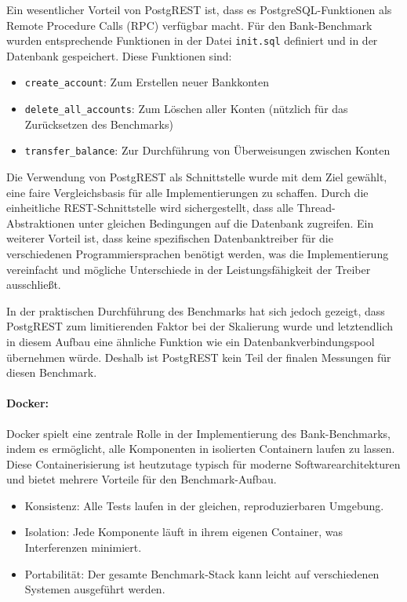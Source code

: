 \documentclass[fontsize=12pt,paper=a4,twoside=semi,parskip=half-,headsepline,headinclude]{scrreprt}
\begin{document}
Ein wesentlicher Vorteil von PostgREST ist, dass es PostgreSQL-Funktionen als Remote Procedure Calls (RPC) verfügbar macht. Für den Bank-Benchmark wurden entsprechende Funktionen in der Datei \texttt{init.sql} definiert und in der Datenbank gespeichert. Diese Funktionen sind:

\begin{itemize}
	\item \texttt{create\_account}: Zum Erstellen neuer Bankkonten
	\item \texttt{delete\_all\_accounts}: Zum Löschen aller Konten (nützlich für das Zurücksetzen des Benchmarks)
	\item \texttt{transfer\_balance}: Zur Durchführung von Überweisungen zwischen Konten
\end{itemize}

Die Verwendung von PostgREST als Schnittstelle wurde mit dem Ziel gewählt, eine faire Vergleichsbasis für alle Implementierungen zu schaffen. Durch die einheitliche REST-Schnitt\-stel\-le wird sichergestellt, dass alle Thread-Abstraktionen unter gleichen Bedingungen auf die Datenbank zugreifen. Ein weiterer Vorteil ist, dass keine spezifischen Datenbanktreiber für die verschiedenen Programmiersprachen benötigt werden, was die Implementierung vereinfacht und mögliche Unterschiede in der Leistungsfähigkeit der Treiber ausschließt.

In der praktischen Durchführung des Benchmarks hat sich jedoch gezeigt, dass PostgREST zum limitierenden Faktor bei der Skalierung wurde und letztendlich in diesem Aufbau eine ähnliche Funktion wie ein Datenbankverbindungspool übernehmen würde. Deshalb ist PostgREST kein Teil der finalen Messungen für diesen Benchmark.

\paragraph{Docker:}
\label{para:docker}

Docker spielt eine zentrale Rolle in der Implementierung des Bank-Bench\-marks, indem es ermöglicht, alle Komponenten in isolierten Containern laufen zu lassen. Diese Containerisierung ist heutzutage typisch für moderne Softwarearchitekturen und bietet mehrere Vorteile für den Benchmark-Aufbau.

\begin{itemize}
	\item Konsistenz: Alle Tests laufen in der gleichen, reproduzierbaren Umgebung.
	\item Isolation: Jede Komponente läuft in ihrem eigenen Container, was Interferenzen minimiert.
	\item Portabilität: Der gesamte Benchmark-Stack kann leicht auf verschiedenen Systemen ausgeführt werden.
\end{itemize}
\end{document}
